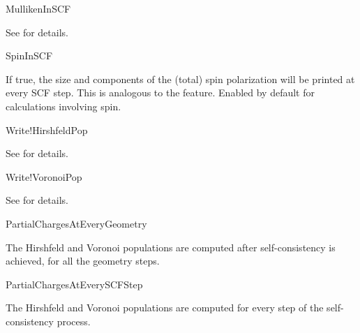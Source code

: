 \begin{fdflogicalF}{MullikenInSCF}

  See  for details.

\end{fdflogicalF}


\begin{fdflogicalT}{SpinInSCF}

If true, the size and components of the (total) spin polarization will
be printed at every SCF step.  This is analogous to the
 feature.  Enabled by default for calculations
involving spin.

\end{fdflogicalT}

\begin{fdflogicalF}{Write!HirshfeldPop}

  See  for details.

\end{fdflogicalF}

\begin{fdflogicalF}{Write!VoronoiPop}

  See  for details.

\end{fdflogicalF}

\begin{fdflogicalF}{PartialChargesAtEveryGeometry}

  The Hirshfeld and Voronoi populations are computed after
  self-consistency is achieved, for all the geometry steps.

\end{fdflogicalF}

\begin{fdflogicalF}{PartialChargesAtEverySCFStep}

  The Hirshfeld and Voronoi populations are computed for every step of
  the self-consistency process.

\end{fdflogicalF}

